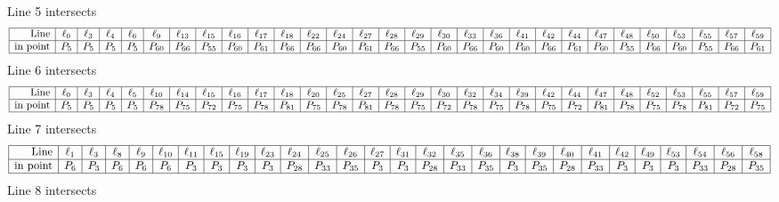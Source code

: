 \documentclass{article}
\begin{document}
{$$$$
Line 5 intersects 
$$
\begin{array}{|r*{28}{|c}|}
\hline
\mbox{Line}  & \ell_{0} & \ell_{3} & \ell_{4} & \ell_{6} & \ell_{9} & \ell_{13} & \ell_{15} & \ell_{16} & \ell_{17} & \ell_{18} & \ell_{22} & \ell_{24} & \ell_{27} & \ell_{28} & \ell_{29} & \ell_{30} & \ell_{33} & \ell_{36} & \ell_{41} & \ell_{42} & \ell_{44} & \ell_{47} & \ell_{48} & \ell_{50} & \ell_{53} & \ell_{55} & \ell_{57} & \ell_{59}\\
\hline
\mbox{in point}  & P_{5} & P_{5} & P_{5} & P_{5} & P_{60} & P_{66} & P_{55} & P_{60} & P_{61} & P_{66} & P_{66} & P_{60} & P_{61} & P_{66} & P_{55} & P_{60} & P_{66} & P_{60} & P_{60} & P_{66} & P_{61} & P_{60} & P_{55} & P_{66} & P_{60} & P_{55} & P_{66} & P_{61}\\
\hline
\end{array}
$$
Line 6 intersects 
$$
\begin{array}{|r*{28}{|c}|}
\hline
\mbox{Line}  & \ell_{0} & \ell_{3} & \ell_{4} & \ell_{5} & \ell_{10} & \ell_{14} & \ell_{15} & \ell_{16} & \ell_{17} & \ell_{18} & \ell_{20} & \ell_{25} & \ell_{27} & \ell_{28} & \ell_{29} & \ell_{30} & \ell_{32} & \ell_{34} & \ell_{39} & \ell_{42} & \ell_{44} & \ell_{47} & \ell_{48} & \ell_{52} & \ell_{53} & \ell_{55} & \ell_{57} & \ell_{59}\\
\hline
\mbox{in point}  & P_{5} & P_{5} & P_{5} & P_{5} & P_{78} & P_{75} & P_{72} & P_{75} & P_{78} & P_{81} & P_{75} & P_{78} & P_{81} & P_{78} & P_{75} & P_{72} & P_{78} & P_{75} & P_{78} & P_{75} & P_{72} & P_{81} & P_{78} & P_{75} & P_{78} & P_{81} & P_{72} & P_{75}\\
\hline
\end{array}
$$
Line 7 intersects 
$$
\begin{array}{|r*{27}{|c}|}
\hline
\mbox{Line}  & \ell_{1} & \ell_{3} & \ell_{8} & \ell_{9} & \ell_{10} & \ell_{11} & \ell_{15} & \ell_{19} & \ell_{23} & \ell_{24} & \ell_{25} & \ell_{26} & \ell_{27} & \ell_{31} & \ell_{32} & \ell_{35} & \ell_{36} & \ell_{38} & \ell_{39} & \ell_{40} & \ell_{41} & \ell_{42} & \ell_{49} & \ell_{53} & \ell_{54} & \ell_{56} & \ell_{58}\\
\hline
\mbox{in point}  & P_{6} & P_{3} & P_{6} & P_{6} & P_{6} & P_{3} & P_{3} & P_{3} & P_{3} & P_{28} & P_{33} & P_{35} & P_{3} & P_{3} & P_{28} & P_{33} & P_{35} & P_{3} & P_{35} & P_{28} & P_{33} & P_{3} & P_{3} & P_{3} & P_{33} & P_{28} & P_{35}\\
\hline
\end{array}
$$
Line 8 intersects 
$$
\begin{array}{|r*{28}{|c}|}

\end{array}$$}
\end{document}
